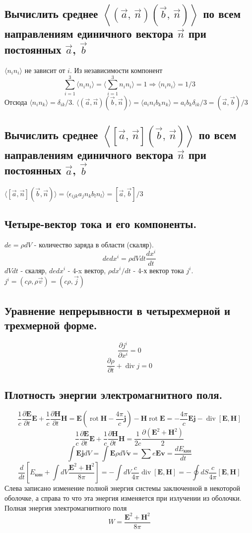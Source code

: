 \documentclass[a4paper,12pt]{article}
\begin{document}
\subsection{Вычислить среднее $\left<\left(\vec{a},\,\vec{n}\right)
\left( \vec{b},\,\vec{n} \right) \right>$ по всем направлениям единичного
вектора $\vec{n}$ при постоянных  $\vec{a}$, $\vec{b}$}
$\langle n_i n_i\rangle$ не зависит от $i$. Из независимости компонент \[\sum_{i=1}^3\langle n_i n_i\rangle=\langle\sum_{i=1}^3 n_i n_i\rangle=1\Rightarrow \langle n_i n_i\rangle=1/3\]
Отсюда $\langle n_i n_k\rangle=\delta_{ik}/3$. $\langle(\vec{a},\vec{n})(\vec{b},\vec{n})\rangle=\langle a_i n_i b_k n_k\rangle=a_i b_k \delta_{ik}/3=(\vec{a},\vec{b})/3$
\subsection{Вычислить среднее $\left<\left[\vec{a},\,\vec{n}\right]
\left( \vec{b},\,\vec{n} \right) \right>$ по всем направлениям единичного
вектора $\vec{n}$ при постоянных  $\vec{a}$, $\vec{b}$}
$\langle[\vec{a},\vec{n}](\vec{b},\vec{n})\rangle=\langle \epsilon_{ijk} a_j n_k b_l n_l\rangle=[\vec{a},\vec{b}]/3$
\subsection{Четыре-вектор тока и его компоненты.}
$de=\rho dV$ - количество заряда в области (скаляр). \[de dx^i=\rho dV dt \frac{dx^i}{dt}\] $dV dt$ - скаляр, $de dx^i$ - 4-x вектор, $\rho dx^i/dt$ - 4-х вектор тока $j^i$. $j^i=(c\rho,\rho\vec{v})=(c\rho,\vec{j})$
\subsection{Уравнение непрерывности в четырехмерной и трехмерной форме.}
\[\frac{\partial j^i}{\partial x^i}=0\]
\[\frac{\partial \rho}{\partial t}+\operatorname{div} j=0 \]
\subsection{Плотность энергии электромагнитного поля.}
\[
\frac{1}{c}\frac{\partial \mathbf{E}}{\partial t}\mathbf{E}+\frac{1}{c}\frac{\partial \mathbf{H}}{\partial t}\mathbf{H}=\mathbf{E}\left(\operatorname{rot}\mathbf{H}-\frac{4\pi}{c}\mathbf{j}\right)-\mathbf{H}\operatorname{rot}\mathbf{E}=-\frac{4\pi}{c}\mathbf{E}\mathbf{j}-\operatorname{div}{[\mathbf{E},\mathbf{H}]}
\]
\[
\frac{1}{c}\frac{\partial \mathbf{E}}{\partial t}\mathbf{E}+\frac{1}{c}\frac{\partial \mathbf{H}}{\partial t}\mathbf{H}=\frac{1}{2c}\frac{\partial (\mathbf{E}^2+\mathbf{H}^2)}{2}
\]
\[\int \mathbf{E}\mathbf{j} dV=\int \mathbf{E}\rho dV \mathbf{v}=\sum e\mathbf{E}\mathbf{v}=\frac{dE_{\text{кин}}}{dt}\]
\[\frac{d}{dt}\left[E_{\text{кин}}+\int dV\frac{\mathbf{E}^2+\mathbf{H}^2}{8\pi}\right]=-\int dV\frac{c}{4\pi}\operatorname{div}{[\mathbf{E},\mathbf{H}]}=-\oint dS \frac{c}{4\pi}[\mathbf{E},\mathbf{H}]\]
Слева записано изменение полной энергия системы заключенной в некоторой оболочке, а справа то что эта энергия изменяется при излучении из оболочки. Полная энергия электромагнитного поля 
\[W=\frac{\mathbf{E}^2+\mathbf{H}^2}{8\pi}\]
\end{document}
